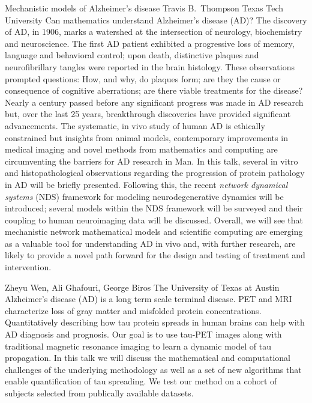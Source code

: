 \begin{addmargin}[2em]{0em}
\vspace{1.5ex}
\abs
{Mechanistic models of Alzheimer's disease}
{Travis B.~Thompson}
{Texas Tech University}
{Can mathematics understand Alzheimer's disease (AD)?  The discovery of AD, in 1906, marks a watershed at the intersection of neurology, biochemistry and neuroscience.  The first AD patient exhibited a progressive loss of memory, language and behavioral control; upon death, distinctive plaques and neurofibrillary tangles were reported in the brain histology.  These observations prompted questions: How, and why, do plaques form; are they the cause or consequence of cognitive aberrations; are there viable treatments for the disease? Nearly a century passed before any significant progress was made in AD research but, over the last 25 years, breakthrough discoveries have provided significant advancements. The systematic, in vivo study of human AD is ethically constrained but insights from animal models, contemporary improvements in medical imaging and novel methods from mathematics and computing are circumventing the barriers for AD research in Man. In this talk, several in vitro and histopathological observations regarding the progression of protein pathology in AD will be briefly presented.  Following this, the recent \textit{network dynamical systems} (NDS) framework for modeling neurodegenerative dynamics will be introduced; several models within the NDS framework will be surveyed and their coupling to human neuroimaging data will be discussed.  Overall, we will see that mechanistic network mathematical models and scientific computing are emerging as a valuable tool for understanding AD in vivo and, with further research, are likely to provide a novel path forward for the design and testing of treatment and intervention.}


\vspace{1.5ex}
{Zheyu Wen, Ali Ghafouri, George Biros}
{The University of Texas at Austin}
{Alzheimer's disease (AD) is a long term scale terminal disease. PET and MRI characterize loss of gray matter and misfolded protein concentrations. Quantitatively describing how tau protein spreads in human brains can help with AD diagnosis and prognosis. Our goal is to use tau-PET images along with traditional magnetic resonance imaging to learn a dynamic model of tau propagation. In this talk we will discuss the mathematical and computational challenges of the underlying methodology as well as a set of new algorithms that enable quantification of tau spreading. We test our method on a cohort of subjects selected from publically available datasets.}



\end{addmargin}
